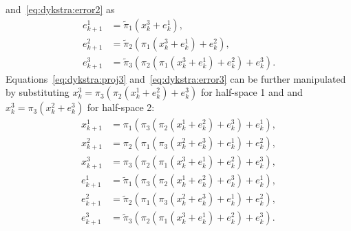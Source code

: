 \documentclass[hidelinks]{article}
\begin{document}
and~\eqref{eq:dykstra:error2} as
\begin{subequations}
\begin{align}
e_{k+1}^1 &= \tilde{\pi}_1(x_k^3+e_k^1),\\
e_{k+1}^2 &= \tilde{\pi}_2(\pi_1(x_k^3+e_k^1)+e_k^2),\\
e_{k+1}^3 &= \tilde{\pi}_3(\pi_2(\pi_1(x_k^3+e_k^1)+e_k^2)+e_k^3).
\end{align}\label{eq:dykstra:error3}
\end{subequations}
Equations~\eqref{eq:dykstra:proj3} and~\eqref{eq:dykstra:error3} can be further manipulated by substituting $x_k^3=\pi_3(\pi_2(x_k^1+e_k^2)+e_k^3)$ for half-space 1 and and $x_k^3=\pi_3(x_k^2+e_k^3)$ for half-space 2:
\begin{subequations}
\begin{align}
x_{k+1}^1 &= \pi_1(\pi_3(\pi_2(x_k^1+e_k^2)+e_k^3)+e_k^1),\\
x_{k+1}^2 &= \pi_2(\pi_1(\pi_3(x_k^2+e_k^3)+e_k^1)+e_k^2),\\
x_{k+1}^3 &= \pi_3(\pi_2(\pi_1(x_k^3+e_k^1)+e_k^2)+e_k^3),\\
e_{k+1}^1 &= \tilde{\pi}_1(\pi_3(\pi_2(x_k^1+e_k^2)+e_k^3)+e_k^1),\\
e_{k+1}^2 &= \tilde{\pi}_2(\pi_1(\pi_3(x_k^2+e_k^3)+e_k^1)+e_k^2),\\
e_{k+1}^3 &= \tilde{\pi}_3(\pi_2(\pi_1(x_k^3+e_k^1)+e_k^2)+e_k^3).
\end{align}\label{eq:dykstra:error3}
\end{subequations}



%
%



\end{document}
